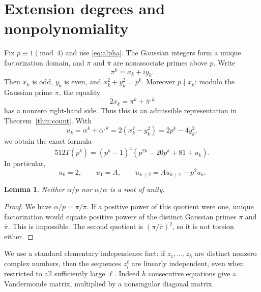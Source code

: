 \documentclass[11pt]{article}
\newtheorem{lemma}[theorem]{Lemma}
\begin{document}
\section{Extension degrees and nonpolynomiality}
Fix $p\equiv1\pmod4$ and use \eqref{eq:alpha}. The Gaussian integers form a unique factorization domain, and $\pi$ and $\overline\pi$ are nonassociate primes above $p$. Write
\[
 \pi^k=x_k+iy_k.
\]
Then $x_k$ is odd, $y_k$ is even, and $x_k^2+y_k^2=p^k$. Moreover $p\nmid x_k$: modulo the Gaussian prime $\pi$, the equality
\[
 2x_k=\pi^k+\overline\pi^{,k}
\]
has a nonzero right-hand side. Thus this is an admissible representation in Theorem~\ref{thm:count}. With
\[
 u_k=\alpha^k+\overline\alpha^{,k}
 =2(x_k^2-y_k^2)=2p^k-4y_k^2,
\]
we obtain the exact formula
\begin{equation}\label{eq:exponential}
 512T(p^k)=(p^k-1)^4\left(p^{2k}-20p^k+81+u_k\right).
\end{equation}
In particular,
\begin{equation}\label{eq:u}
 u_0=2,\qquad u_1=A,\qquad u_{k+2}=Au_{k+1}-p^2u_k.
\end{equation}

\begin{lemma}\label{lem:nontorsion}
Neither $\alpha/p$ nor $\alpha/\overline\alpha$ is a root of unity.
\end{lemma}
\begin{proof}
We have $\alpha/p=\pi/\overline\pi$. If a positive power of this quotient were one, unique factorization would equate positive powers of the distinct Gaussian primes $\pi$ and $\overline\pi$. This is impossible. The second quotient is $(\pi/\overline\pi)^2$, so it is not torsion either.
\end{proof}

We use a standard elementary independence fact: if $z_1,\ldots,z_h$ are distinct nonzero complex numbers, then the sequences $z_i^\ell$ are linearly independent, even when restricted to all sufficiently large $\ell$. Indeed $h$ consecutive equations give a Vandermonde matrix, multiplied by a nonsingular diagonal matrix.
\end{document}
